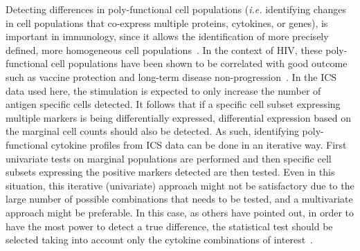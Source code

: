 \documentclass[useAMS,referee,usenatbib]{biom}
\begin{document}
Detecting differences in poly-functional cell populations (\textit{i.e.} identifying changes in cell populations that co-express multiple proteins, cytokines, or genes), is important in immunology, since it allows the identification of more precisely defined, more homogeneous cell populations~\citep{Milush:2009bz}. 
In the context of HIV, these poly-functional cell populations have been shown to be correlated with good outcome such as vaccine protection and long-term disease non-progression~\citep{Betts:2006dw,Darrah:2007ih,Precopio:2007ht}. 
In the ICS data used here, the stimulation is expected to only increase the number of antigen specific cells detected.
It  follows that if a specific cell subset expressing multiple markers is being differentially expressed, differential expression based on the marginal cell counts should also be detected. 
As such, identifying poly-functional cytokine profiles from ICS data can be done in an iterative way. 
First univariate tests on marginal populations are performed and then specific cell subsets expressing the positive markers detected are then tested. 
Even in this situation, this iterative (univariate) approach might not be satisfactory due to the large number of possible combinations that needs to be tested, and a multivariate approach might be preferable. 
In this case, as others have pointed out, in order to have the most power to detect a true difference, the statistical test should be selected taking into account only the cytokine combinations of interest~\citep{Nason:2006dx}. 
\end{document}

